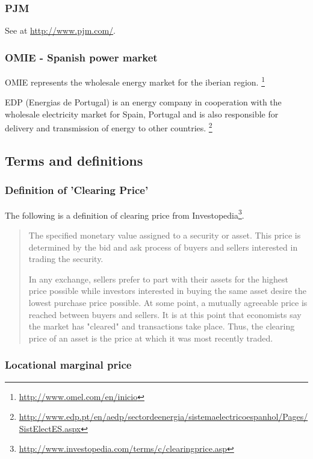 \subsubsection{PJM}

See at \url{http://www.pjm.com/}. 


\subsubsection{OMIE - Spanish power market}

OMIE represents the wholesale energy market for the iberian region. \footnote{\url{http://www.omel.com/en/inicio}}

EDP (Energias de Portugal) is an energy company in cooperation with the wholesale electricity market for Spain, Portugal and is also responsible for delivery and transmission of energy to other countries. \footnote{\url{http://www.edp.pt/en/aedp/sectordeenergia/sistemaelectricoespanhol/Pages/SistElectES.aspx}}



\subsection{Terms and definitions}

\subsubsection{Definition of 'Clearing Price'}

The following is a definition of clearing price from Investopedia\footnote{\url{http://www.investopedia.com/terms/c/clearingprice.asp}}. 

\begin{quote}
The specified monetary value assigned to a security or asset. This price is determined by the bid and ask process of buyers and sellers interested in trading the security.

In any exchange, sellers prefer to part with their assets for the highest price possible while investors interested in buying the same asset desire the lowest purchase price possible. At some point, a mutually agreeable price is reached between buyers and sellers. It is at this point that economists say the market has "cleared" and transactions take place. Thus, the clearing price of an asset is the price at which it was most recently traded.
\end{quote}


\subsubsection{Locational marginal price}

